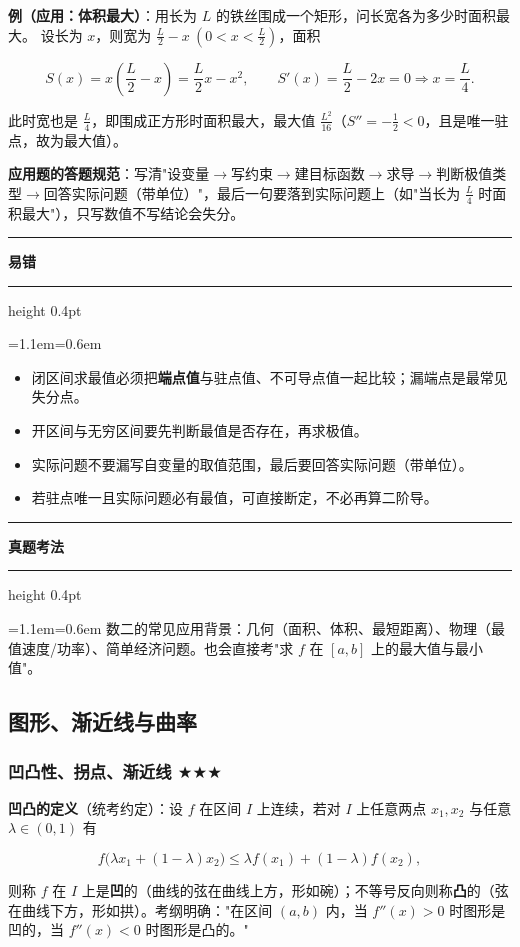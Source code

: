 \documentclass[11pt,openany,UTF8]{ctexbook}
\newcommand{\callouthead}[2]{%
  \par\addvspace{7pt}\noindent
  {\color{#1}\rule[-0.15em]{3pt}{1.05em}}\hspace{0.5em}%
  {\bfseries\color{#1}#2}\par\nobreak\vspace{-0.35em}%
  {\color{rulesep}\hrule height 0.4pt}\nobreak\vspace{0.45em}%
  \begingroup\small\setlength{\parindent}{0pt}%
  \leftskip=1.1em\rightskip=0.6em\noindent\ignorespaces}
\newcommand{\calloutend}{\par\endgroup\addvspace{7pt}}
\newenvironment{callwarn}[1]{\callouthead{warnbar}{#1}}{\calloutend}
\newenvironment{callexam}[1]{\callouthead{exambar}{#1}}{\calloutend}
\begin{document}
\textbf{例（应用：体积最大）}：用长为 $L$ 的铁丝围成一个矩形，问长宽各为多少时面积最大。 设长为 $x$，则宽为 $\frac L2-x\ (0<x<\frac L2)$，面积

\[S(x)=x\left(\frac L2-x\right)=\frac L2x-x^2,\qquad S'(x)=\frac L2-2x=0\Rightarrow x=\frac L4 .\]

此时宽也是 $\frac L4$，即围成正方形时面积最大，最大值 $\frac{L^2}{16}$（$S''=-\frac12<0$，且是唯一驻点，故为最大值）。

\textbf{应用题的答题规范}：写清"设变量$\to$写约束$\to$建目标函数$\to$求导$\to$判断极值类型$\to$回答实际问题（带单位）"，最后一句要落到实际问题上（如"当长为 $\frac L4$ 时面积最大"），只写数值不写结论会失分。

\begin{callwarn}{易错}
\begin{itemize}
\item 闭区间求最值必须把\textbf{端点值}与驻点值、不可导点值一起比较；漏端点是最常见失分点。
\item 开区间与无穷区间要先判断最值是否存在，再求极值。
\item 实际问题不要漏写自变量的取值范围，最后要回答实际问题（带单位）。
\item 若驻点唯一且实际问题必有最值，可直接断定，不必再算二阶导。
\end{itemize}
\end{callwarn}

\begin{callexam}{真题考法}
数二的常见应用背景：几何（面积、体积、最短距离）、物理（最值速度/功率）、简单经济问题。也会直接考"求 $f$ 在 $[a,b]$ 上的最大值与最小值"。

\end{callexam}

\subsection{图形、渐近线与曲率}

\subsubsection{凹凸性、拐点、渐近线 $\bigstar$$\bigstar$$\bigstar$}

\textbf{凹凸的定义}（统考约定）：设 $f$ 在区间 $I$ 上连续，若对 $I$ 上任意两点 $x_1,x_2$ 与任意 $\lambda\in(0,1)$ 有

\[f\big(\lambda x_1+(1-\lambda)x_2\big)\le \lambda f(x_1)+(1-\lambda)f(x_2),\]

则称 $f$ 在 $I$ 上是\textbf{凹}的（曲线的弦在曲线上方，形如碗）；不等号反向则称\textbf{凸}的（弦在曲线下方，形如拱）。考纲明确："在区间 $(a,b)$ 内，当 $f''(x)>0$ 时图形是凹的，当 $f''(x)<0$ 时图形是凸的。"
\end{document}
